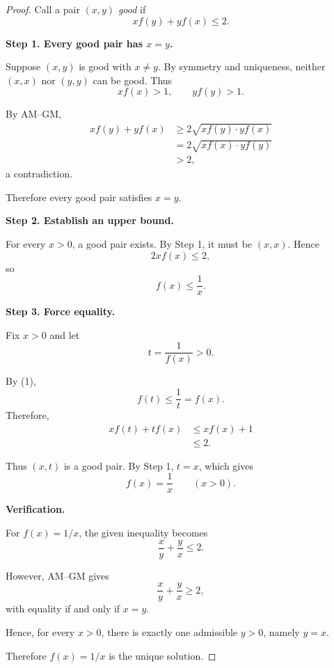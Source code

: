 
\begin{dlsummary}[title={\bfseries Solution 17. IMO 2022 Shortlist -- Algebra A3},breakable]

\begin{proof}
Call a pair $(x,y)$ \emph{good} if
\[
xf(y)+yf(x)\leq2.
\]

\medskip
\noindent
\textbf{Step 1. Every good pair has $x=y$.}

Suppose $(x,y)$ is good with $x\ne y$.
By symmetry and uniqueness, neither
$(x,x)$ nor $(y,y)$ can be good. Thus
\[
xf(x)>1,\qquad yf(y)>1.
\]

By AM--GM,
\[
\begin{aligned}
xf(y)+yf(x)
&\geq2\sqrt{xf(y)\cdot yf(x)}\\
&=2\sqrt{xf(x)\cdot yf(y)}\\
&>2,
\end{aligned}
\]
a contradiction.

Therefore every good pair satisfies $x=y$.

\medskip
\noindent
\textbf{Step 2. Establish an upper bound.}

For every $x>0$, a good pair exists.
By Step 1, it must be $(x,x)$. Hence
\[
2xf(x)\leq2,
\]
so
\[
\boxed{f(x)\leq\frac1x.} \tag{1}
\]

\medskip
\noindent
\textbf{Step 3. Force equality.}

Fix $x>0$ and let
\[
t=\frac1{f(x)}>0.
\]

By (1),
\[
f(t)\leq\frac1t=f(x).
\]
Therefore,
\[
\begin{aligned}
xf(t)+tf(x)
&\leq xf(x)+1\\
&\leq2.
\end{aligned}
\]

Thus $(x,t)$ is a good pair. By Step 1,
$t=x$, which gives
\[
\boxed{f(x)=\frac1x\qquad(x>0).}
\]

\medskip
\noindent
\textbf{Verification.}

For $f(x)=1/x$, the given inequality becomes
\[
\frac{x}{y}+\frac{y}{x}\leq2.
\]

However, AM--GM gives
\[
\frac{x}{y}+\frac{y}{x}\geq2,
\]
with equality if and only if $x=y$.

Hence, for every $x>0$, there is exactly
one admissible $y>0$, namely $y=x$.

Therefore $f(x)=1/x$ is the unique solution.
\end{proof}


\end{dlsummary}
